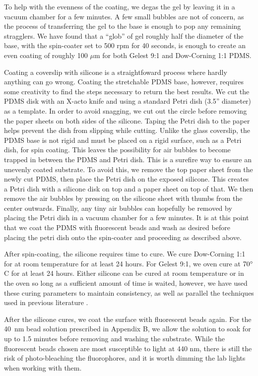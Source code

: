 To help with the evenness of the coating, we degas the gel by leaving it in a vacuum chamber for a few minutes. A few small bubbles are not of concern, as the process of transferring the gel to the base is enough to pop any remaining stragglers. We have found that a ``glob'' of gel roughly half the diameter of the base, with the spin-coater set to 500 rpm for 40 seconds, is enough to create an even coating of roughly 100 $\mu$m for both Gelest 9:1 and Dow-Corning 1:1 PDMS.

Coating a coverslip with silicone is a straightfoward process where hardly anything can go wrong. Coating the stretchable PDMS base, however, requires some creativity to find the steps necessary to return the best results. We cut the PDMS disk with an X-acto knife and using a standard Petri dish (3.5'' diameter) as a template. In order to avoid snagging, we cut out the circle before removing the paper sheets on both sides of the silicone. Taping the Petri dish to the paper helps prevent the dish from slipping while cutting. Unlike the glass coverslip, the PDMS base is not rigid and must be placed on a rigid surface, such as a Petri dish, for spin coating. This leaves the possibility for air bubbles to become trapped in between the PDMS and Petri dish. This is a surefire way to ensure an unevenly coated substrate. To avoid this, we remove the top paper sheet from the newly cut PDMS, then place the Petri dish on the exposed silicone. This creates a Petri dish with a silicone disk on top and a paper sheet on top of that. We then remove the air bubbles by pressing on the silicone sheet with thumbs from the center outwards. Finally, any tiny air bubbles can hopefully be removed by placing the Petri dish in a vacuum chamber for a few minutes. It is at this point that we coat the PDMS with fluorescent beads and wash as desired before placing the petri dish onto the spin-coater and proceeding as described above.

After spin-coating, the silicone requires time to cure. We cure Dow-Corning 1:1 for at room temperature for at least 24 hours. For Gelest 9:1, we oven cure at $70 \degree$ C for at least 24 hours. Either silicone can be cured at room temperature or in the oven so long as a sufficient amount of time is waited, however, we have used these curing parameters to maintain consistency, as well as parallel the techniques used in previous literature \cite{xu2017direct}.

After the silicone cures, we coat the surface with fluorescent beads again. For the 40~nm bead solution prescribed in Appendix B, we allow the solution to soak for up to 1.5 minutes before removing and washing the substrate. While the fluorescent beads chosen are most susceptible to light at 440 nm, there is still the risk of photo-bleaching the fluorophores, and it is worth dimming the lab lights when working with them. 

